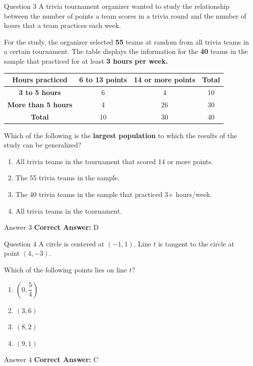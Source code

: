 \documentclass{beamer}
\begin{document}
\begin{frame}{Question 3}
\small
A trivia tournament organizer wanted to study the relationship between the number of points a team scores in a trivia round and the number of hours that a team practices each week.

For the study, the organizer selected \textbf{55} teams at random from all trivia teams in a certain tournament. The table displays the information for the \textbf{40} teams in the sample that practiced for at least \textbf{3 hours per week.}

\begin{center}
\begin{tabular}{|c|c|c|c|}
\hline
\textbf{Hours practiced} & \textbf{6 to 13 points} & \textbf{14 or more points} & \textbf{Total} \\
\hline
\textbf{3 to 5 hours} & 6 & 4 & 10 \\
\textbf{More than 5 hours} & 4 & 26 & 30 \\
\hline
\textbf{Total} & 10 & 30 & 40 \\
\hline
\end{tabular}
\end{center}

Which of the following is the \textbf{largest population} to which the results of the study can be generalized?
\vspace{0.35cm}
\begin{enumerate}
    \item[A.] All trivia teams in the tournament that scored 14 or more points.
    \item[B.] The 55 trivia teams in the sample.
    \item[C.] The 40 trivia teams in the sample that practiced 3+ hours/week.
    \item[D.] All trivia teams in the tournament.
\end{enumerate}
\end{frame}
\begin{frame}{Answer 3}
\small
\textbf{Correct Answer:} D
\end{frame}

\begin{frame}{Question 4}
\small
A circle is centered at \((-1,1)\). Line \(t\) is tangent to the circle at point \((4,-3)\).

Which of the following points lies on line \(t\)?
\vspace{0.35cm}
\begin{enumerate}
    \item[A.] \(\left(0,\dfrac{5}{4}\right)\)
    \item[B.] \((3,6)\)
    \item[C.] \((8,2)\)
    \item[D.] \((9,1)\)
\end{enumerate}
\end{frame}
\begin{frame}{Answer 4}
\small
\textbf{Correct Answer:} C
\end{frame}
\end{document}
